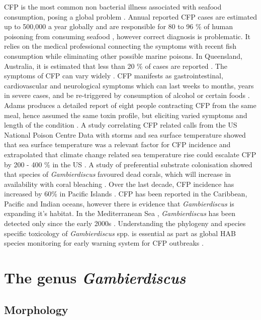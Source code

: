 \documentclass[12pt]{article}
\begin{document}
CFP is the most common non bacterial illness associated with seafood consumption, posing a global problem \cite{friedman2008ciguatera}. %
Annual reported CFP cases are estimated up to 500,000 a year globally and are responsible for 80 to 96 \% of human poisoning from consuming seafood \cite{fleming1998seafood,grandjean2008centers}, however correct diagnosis is problematic. It relies on the medical professional connecting the symptoms with recent fish consumption while eliminating other possible marine poisons. In Queensland, Australia, it is estimated that less than 20 \% of cases are reported \cite{lewis2006ciguatera}.
The symptoms of CFP can vary widely \cite{sims1987theoretical}. CFP manifests as gastrointestinal, cardiovascular and neurological symptoms which can last weeks to months, years in severe cases, and be re-triggered by consumption of alcohol or certain foods \cite{lewis2006ciguatera}. Adams produces a detailed report of eight people contracting CFP from the same meal, hence assumed the same toxin profile, but eliciting varied symptoms and length of the condition \cite{adams1993outbreak}. 
A study correlating CFP related calls from the US National Poison Centre Data with storms and sea surface temperature showed that sea surface temperature was a relevant factor for CFP incidence and extrapolated that climate change related sea temperature rise could escalate CFP by 200 - 400 \% in the US \cite{garces2012habitat}. A study of preferential substrate colonisation showed that species of \emph{Gambierdiscus} favoured dead corals, which will increase in availability with coral bleaching \cite{grzebyk1994ecology}. Over the last decade, CFP incidence has increased by 60\% in Pacific Islands \cite{skinner2011ciguatera}.
CFP has been reported in the Caribbean, Pacific and Indian oceans, however there is evidence that \emph{Gambierdiscus} is expanding it's habitat. In the Mediterranean Sea \cite{lejeusne2010climate}, \emph{Gambierdiscus} has been detected only since the early 2000s \cite{aligizaki2008morphological}.
Understanding the phylogeny and species specific toxicology of \emph{Gambierdiscus} spp. is essential as part as global HAB species monitoring for early warning system for CFP outbreaks \cite{berdalet2012global}.

\section{The genus \emph{Gambierdiscus}}
\subsection{Morphology}
\end{document}
